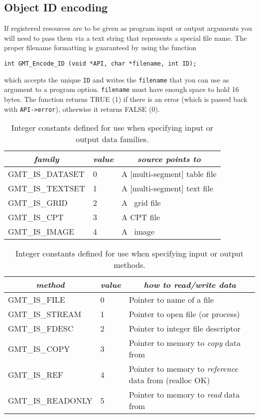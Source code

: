 \documentclass[11pt]{report}
\begin{document}
\subsection{Object ID encoding}
If registered resources are to be given as program input or output arguments you will need to pass them via
a text string that represents a special file name.  The proper filename formatting is guaranteed by using the
function

\begin{verbatim}
int GMT_Encode_ID (void *API, char *filename, int ID);
\end{verbatim}
which accepts the unique \texttt{ID} and writes the \texttt{filename} that
you can use as argument to a program option.  \texttt{filename} must have enough space to hold 16 bytes.
The function returns TRUE (1) if there is an error (which is passed back with \texttt{API->error}),
otherwise it returns FALSE (0).


\begin{table}[h]
\small
\centering
\begin{tabular}{|l|l|l|} \hline
\multicolumn{1}{|c|}{\emph{family}} & \multicolumn{1}{c|}{\emph{value}} & \multicolumn{1}{c|}{\emph{source points to}} \\ \hline
GMT\_IS\_DATASET	&	0	&	A [multi-segment] table file \\ \hline
GMT\_IS\_TEXTSET	&	1	&	A [multi-segment] text file \\ \hline
GMT\_IS\_GRID		&	2	&	A \GMT\ grid file \\ \hline
GMT\_IS\_CPT		&	3	&	A CPT file \\ \hline
GMT\_IS\_IMAGE		&	4	&	A \GMT\ image \\ \hline
\end{tabular}
\caption{Integer constants defined for use when specifying input or output data families.}
\label{tbl:family}
\end{table}


\begin{table}[h]
\small
\centering
\begin{tabular}{|l|l|l|} \hline
\multicolumn{1}{|c|}{\emph{method}} & \multicolumn{1}{c|}{\emph{value}} & \multicolumn{1}{c|}{\emph{how to read/write data}} \\ \hline
GMT\_IS\_FILE		&	0	&       Pointer to name of a file \\ \hline
GMT\_IS\_STREAM		&	1	&       Pointer to open file (or process)  \\ \hline
GMT\_IS\_FDESC		&	2	&       Pointer to integer file descriptor \\ \hline
GMT\_IS\_COPY		&	3	&       Pointer to memory to \emph{copy} data from \\ \hline
GMT\_IS\_REF		&	4	&       Pointer to memory to \emph{reference} data from (realloc OK) \\ \hline
GMT\_IS\_READONLY	&	5	&       Pointer to memory to \emph{read} data from \\ \hline
\end{tabular}
\caption{Integer constants defined for use when specifying input or output methods.}
\label{tbl:methods}
\end{table}
\end{document}
